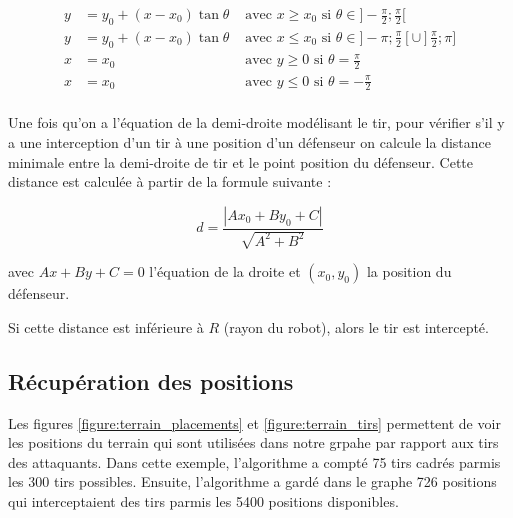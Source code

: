 \documentclass[12pt]{article}
\begin{document}
\begin{align*}
y & =  y_0 + (x - x_0)\tan \theta & \text{ avec $x \geqslant x_0$ si } \theta \in ]-\frac{\pi}{2}; \frac{\pi}{2} [ \\
y & = y_0 + (x - x_0)\tan \theta & \text{ avec $x \leqslant x_0$ si } \theta \in ]-\pi; \frac{\pi}{2}[ \cup ]\frac{\pi}{2}; \pi ] \\
x & = x_0  & \text{ avec $y \geqslant 0$ si } \theta = \frac{\pi}{2} \\
x & = x_0  & \text{ avec $y \leqslant 0$ si } \theta = -\frac{\pi}{2} \\
\end{align*}

Une fois qu'on a l'équation de la demi-droite modélisant le tir, pour vérifier s'il y a une interception d'un tir à une position d'un défenseur on calcule la distance minimale entre la demi-droite de tir et le point position du défenseur. Cette distance est calculée à partir de la formule suivante :

\begin{equation*}
  d = \frac{|Ax_0 + By_0 + C|}{\sqrt{A^2+B^2}}
\end{equation*}

avec $Ax+By+C = 0$ l'équation de la droite et $(x_0, y_0)$ la position du défenseur.

 Si cette distance est inférieure à $R$ (rayon du robot), alors le tir est intercepté.

\subsection{Récupération des positions}

Les figures \ref{figure:terrain_placements} et \ref{figure:terrain_tirs} permettent de voir les positions du terrain qui sont utilisées dans notre grpahe par rapport aux tirs des attaquants. Dans cette exemple, l'algorithme a compté 75 tirs cadrés parmis les 300 tirs possibles. Ensuite, l'algorithme a gardé dans le graphe 726 positions qui interceptaient des tirs parmis les 5400 positions disponibles.
\end{document}

